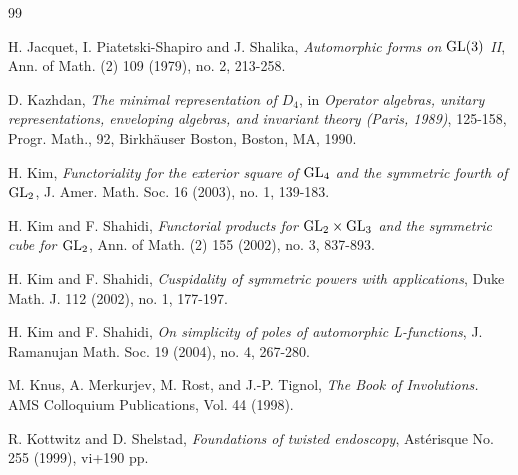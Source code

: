 \documentclass[11pt]{amsart}
\theoremstyle{plain}
\numberwithin{equation}{section}
\def\GSpin{{\rm GSpin}}
\def\GL{{\rm GL}}
\begin{document}
\begin{thebibliography}{99}
 
  
 
 
 
   H. Jacquet, I. Piatetski-Shapiro and J. Shalika, {\em Automorphic forms on $\GL(3)$ II}, Ann. of Math. (2) 109 (1979), no. 2, 213-258. 
 
  D. Kazhdan, {\em The minimal representation of $D_4$}, in {\em  Operator algebras, unitary representations, enveloping algebras, and invariant theory (Paris, 1989)}, 125-158, Progr. Math., 92, Birkhäuser Boston, Boston, MA, 1990.
 
  H. Kim, {\em Functoriality for the exterior square of $\GL_4$ and the symmetric fourth of $\GL_2$},  J. Amer. Math. Soc. 16 (2003), no. 1, 139-183.
 
  H. Kim and F. Shahidi, {\em Functorial products for  $\GL_2 \times \GL_3$ and the symmetric cube for $\GL_2$},   Ann. of Math. (2) 155 (2002), no. 3, 837-893.
 
 H. Kim and F. Shahidi, {\em Cuspidality of symmetric powers with applications},  Duke Math. J. 112 (2002), no. 1, 177-197.
 
 H. Kim and F. Shahidi, {\em On simplicity of poles of automorphic L-functions},  J. Ramanujan Math. Soc. 19 (2004), no. 4, 267-280.

 

 M. Knus, A. Merkurjev, M. Rost, and J.-P. Tignol,
  {\em The Book of Involutions.}  AMS Colloquium Publications,
  Vol. 44 (1998).
  
 R. Kottwitz and D. Shelstad, {\em  Foundations of twisted endoscopy},  Ast\'erisque No. 255 (1999), vi+190 pp.
 
 


\end{thebibliography}
\end{document}
